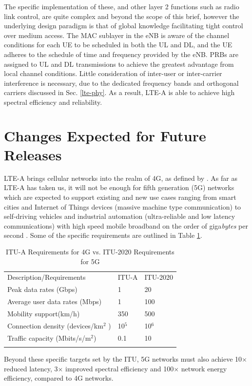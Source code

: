 The specific implementation of these, and other layer 2 functions such as radio link control, are quite complex and beyond the scope of this brief, however the underlying design paradigm is that of global knowledge facilitating tight control over medium access. The MAC sublayer in the eNB is aware of the channel conditions for each UE to be scheduled in both the UL and DL, and the UE adheres to the schedule of time and frequency provided by the eNB.  PRBs are assigned to UL and DL transmissions to achieve the greatest advantage from local channel conditions. Little consideration of inter-user or inter-carrier interference is necessary, due to the dedicated frequency bands and orthogonal carriers discussed in Sec. \ref{lte-phy}.  As a result, LTE-A is able to achieve high spectral efficiency and reliability.


\section {Changes Expected for Future Releases}
\label{fut-chnge}
LTE-A brings cellular networks into the realm of 4G, as defined by \cite{itu-advanced}.  As far as LTE-A has taken us, it will not be enough for fifth generation (5G) networks which are expected to support existing and new use cases ranging from smart cities and Internet of Things devices (massive machine type communication) to self-driving vehicles and industrial automation (ultra-reliable and low latency communications) with  high speed mobile broadband on the order of giga\emph{bytes} per second \cite{itu-2020}.  Some of the specific requirements are outlined in Table \ref{5g-table}.
\begin{table}
	\caption{ITU-A Requirements for 4G vs. ITU-2020 Requirements for 5G  \cite{itu-2020}}
	\label{5g-table}      
	\begin{tabular}{p{}p{}p{}}
		\hline\noalign{\smallskip}
		Description/Requirements & ITU-A & ITU-2020  \\
		\noalign{\smallskip}\svhline\noalign{\smallskip}
		Peak data rates (Gbps) & 1  & 20\\
		Average user data rates (Mbps) & 1  & 100  \\				
		Mobility support(km/h) & 350  & 500 \\
		Connection density (devices/km$^2$ )& 10$^5$ & 10$^6$ \\
		Traffic capacity (Mbits/s/m$^2$) & 0.1 & 10 \\
		\noalign{\smallskip}\hline\noalign{\smallskip}
	\end{tabular}
		
\end{table}
Beyond these specific targets set by the ITU, 5G networks must also achieve 10$\times$ reduced latency, 3$\times$ improved spectral efficiency and  100$\times$ network energy efficiency, compared to 4G networks. 

